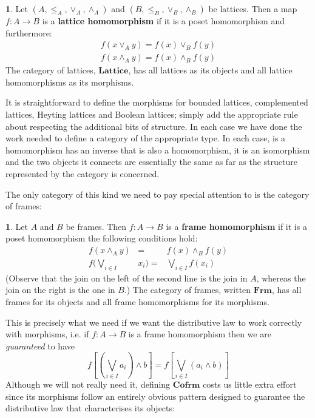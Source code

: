 \documentclass[oneside,english]{amsbook}
\numberwithin{section}{chapter}
\theoremstyle{plain}
\theoremstyle{definition}
\newtheorem{defn}[thm]{\protect\definitionname}
\providecommand{\definitionname}{Definition}
\begin{document}
\begin{defn} 
	Let $(A,\le_{A},\lor_{A},\land_{A})$ and $(B,\le_{B},\lor_{B},\land_{B})$ be lattices. Then a map $f:A\to B$ is a \textbf{lattice homomorphism} if it is a poset homomorphism and furthermore: 
		\begin{multline*} 
			f(x\lor_{A}y)=f(x)\lor_{B}f(y)\\ 
			f(x\land_{A}y)=f(x)\land_{B}f(y) 
		\end{multline*}
	The category of lattices, \textbf{$\mathbf{Lattice}$}, has all lattices as its objects and all lattice homomorphisms as its morphisms. 
\end{defn} 

It is straightforward to define the morphisms for bounded lattices, complemented lattices, Heyting lattices and Boolean lattices; simply add the appropriate rule about respecting the additional bits of structure. In each case we have done the work needed to define a category of the appropriate type. In each case, is a homomorphism has an inverse that is also a homomorphism, it is an isomorphism and the two objects it connects are essentially the same as far as the structure represented by the category is concerned.

The only category of this kind we need to pay special attention to is the category of frames: 

\begin{defn} 
	Let $A$ and $B$ be frames. Then $f:A\to B$ is a \textbf{frame homomorphism} if it is a poset homomorphism the following conditions hold:
		\begin{eqnarray*} 
			f(x\land_{A}y) & = & f(x)\land_{B}f(y)\\ 
			f(\bigvee_{i\in I} & x_{i})= & \bigvee_{i\in I}f(x_{i}) 
		\end{eqnarray*}
	(Observe that the join on the left of the second line is the join in $A$, whereas the join on the right is the one in $B$.) The category of frames, written \textbf{$\mathbf{Frm}$}, has all frames for its objects and all frame homomorphisms for its morphisms. 
\end{defn} 

This is precisely what we need if we want the distributive law to work correctly with morphisms, i.e. if $f:A\to B$ is a frame homomorphism then we are \emph{guaranteed }to have
\[ 
	f[(\bigvee_{i\in I}a_{i})\land b]=f[\bigvee_{i\in I}(a_{i}\land b)] 
\] 
Although we will not really need it, defining \textbf{$\mathbf{Cofrm}$} costs us little extra effort since its morphisms follow an entirely obvious pattern designed to guarantee the distributive law that characterises its objects:
 
\end{document}
